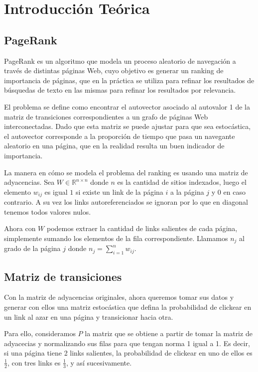 \section{Introducción Teórica}

\subsection{PageRank}

PageRank es un algoritmo que modela un proceso aleatorio de navegación a través de
distintas páginas Web, cuyo objetivo es generar un ranking de importancia de páginas,
que en la práctica se utiliza para refinar los resultados de búsquedas de texto en las mismas
para refinar los resultados por relevancia.

El problema se define como encontrar el autovector asociado al autovalor 1 de la matriz de transiciones
correspondientes a un grafo de páginas Web interconectadas. Dado que esta matriz se puede ajustar
para que sea estocástica, el autovector corresponde a la proporción de tiempo que pasa un navegante
aleatorio en una página, que en la realidad resulta un buen indicador de importancia.

La manera en cómo se modela el problema del ranking es usando una matriz de adyacencias.
Sea $W \in \mathbb{R}^{n \times n}$ donde $n$ es la cantidad de sitios indexados, luego el elemento
$w_{ij}$ es igual $1$ si existe un link de la página $i$ a la página $j$ y $0$ en caso
contrario. A su vez los links autoreferenciados se ignoran por lo que en diagonal tenemos todos valores nulos.

Ahora con $W$ podemos extraer la cantidad de links salientes de cada página,
simplemente sumando los elementos de la fila correspondiente. Llamamos $n_j$
al grado de la página $j$ donde $n_j = \sum^{n}_{i = 1} w_{ij}$.

\subsection{Matriz de transiciones}

Con la matriz de adyacencias originales, ahora queremos tomar sus datos y generar con ellos
una matriz estocástica que defina la probabilidad de clickear en un link al azar
en una página y transicionar hacia otra.

Para ello, consideramos $P$ la matriz que se obtiene a partir de tomar la matriz de
adyacecias y normalizando sus filas para que tengan norma 1 igual a 1. Es decir,
si una página tiene 2 links salientes, la probabilidad de clickear en uno de ellos
es $\frac{1}{2}$, con tres links es $\frac{1}{3}$, y así sucesivamente.

